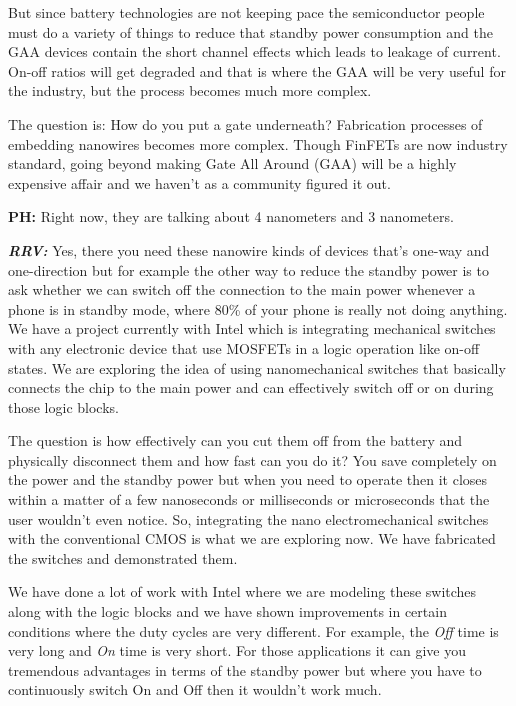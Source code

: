 \begin{multicols}{2}
 But since battery technologies are not keeping pace the semiconductor people must do a variety of things to reduce that standby power consumption and the GAA devices contain the short channel effects which leads to leakage of current. On-off ratios will get degraded and that is where the GAA will be very useful for the industry, but the process becomes much more complex.
 
 The question is: How do you put a gate underneath? Fabrication processes of embedding nanowires becomes more complex. Though FinFETs are now industry standard, going beyond making Gate All Around (GAA) will be a highly expensive affair and we haven’t as a community figured it out.
 
\textbf{PH:} Right now, they are talking about 4 nanometers and 3 nanometers.

\textbf{\textit{RRV:}} Yes, there you need these nanowire kinds of devices that’s one-way and one-direction but for example the other way to reduce the standby power is to ask whether we can switch off the connection to the main power whenever a phone is in standby mode, where 80\% of your phone is really not doing anything. We have a project currently with Intel which is integrating mechanical switches with any electronic device that use MOSFETs in a logic operation like on-off states. We are exploring the idea of using nanomechanical switches that basically connects the chip to the main power and can effectively switch off or on during those logic blocks.

The question is how effectively can you cut them off from the battery and physically disconnect them and how fast can you do it?  You save completely on the power and the standby power but when you need to operate then it closes within a matter of a few nanoseconds or milliseconds or microseconds that the user wouldn’t even notice. So, integrating the nano electromechanical switches with the conventional CMOS is what we are exploring now. We have fabricated the switches and demonstrated them.

We have done a lot of work with Intel where we are modeling these switches along with the logic blocks and we have shown improvements in certain conditions where the duty cycles are very different. For example, the \textit{Off} time is very long and \textit{On} time is very short. For those applications it can give you tremendous advantages in terms of the standby power but where you have to continuously switch On and Off then it wouldn’t work much.


\end{multicols}
